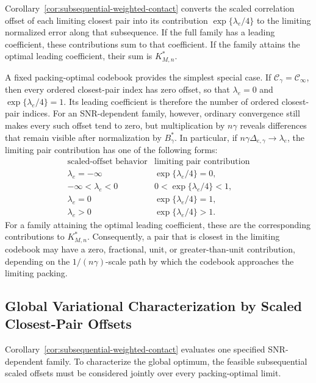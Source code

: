 \documentclass[12pt,draftclsnofoot,onecolumn]{IEEEtran}
\newcommand{\cC}{\mathcal{C}}
\theoremstyle{definition}
\begin{document}
Corollary~\ref{cor:subsequential-weighted-contact} converts the scaled
correlation offset of each limiting closest pair into its contribution
\(\exp\{\lambda_e/4\}\) to the limiting normalized error along that
subsequence.  If the full family has a leading coefficient, these
contributions sum to that coefficient.  If the family attains the optimal
leading coefficient, their sum is \(K^{\ast}_{M,n}\).
 


A fixed packing-optimal codebook provides the simplest special case.  If
\(\cC_\gamma=\cC_\infty\), then every ordered closest-pair index has
zero offset, so that \(\lambda_e=0\) and \(\exp\{\lambda_e/4\}=1\).
Its leading coefficient is therefore the number of ordered closest-pair
indices.  For an SNR-dependent family, however, ordinary convergence
still makes every such offset tend to zero, but multiplication by
\(n\gamma\) reveals differences that remain visible after normalization
by \(B_\gamma^{\ast}\).  In particular, if
\(n\gamma\Delta_{e,\gamma}\longrightarrow\lambda_e\), the limiting
pair contribution has one of the following forms:
\[
\begin{array}{c|c}
\text{scaled-offset behavior} & \text{limiting pair contribution}\\
\hline
\lambda_e=-\infty
    & \exp\{\lambda_e/4\}=0,\\
-\infty<\lambda_e<0
    & 0<\exp\{\lambda_e/4\}<1,\\
\lambda_e=0
    & \exp\{\lambda_e/4\}=1,\\
\lambda_e>0
    & \exp\{\lambda_e/4\}>1.
\end{array}
\]
For a family attaining the optimal leading coefficient, these are the corresponding
contributions to \(K^{\ast}_{M,n}\).
Consequently, a pair that is closest in the limiting codebook may have a
zero, fractional, unit, or greater-than-unit contribution, depending on the
\(1/(n\gamma)\)-scale path by which the codebook approaches the limiting
packing.



 


\subsection{Global Variational Characterization by Scaled Closest-Pair Offsets}
\label{subsec:weighted-contact-variational-characterization}

Corollary~\ref{cor:subsequential-weighted-contact} evaluates one specified
SNR-dependent family.  To characterize the global optimum, the feasible
subsequential scaled offsets must be considered jointly over every
packing-optimal limit.
\end{document}
